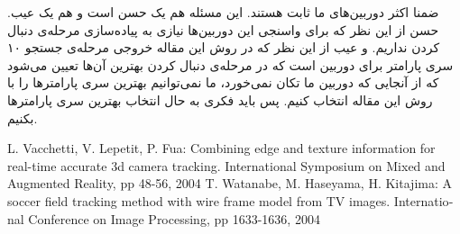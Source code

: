 \documentclass{report}
\renewcommand{\baselinestretch}{1.8}
\begin{document}
ضمنا اکثر دوربین‌های ما ثابت هستند. این مسئله هم یک حسن است و هم یک عیب. حسن از این نظر که برای واسنجی این دوربین‌ها نیازی به پیاده‌سازی مرحله‌ی دنبال کردن نداریم. و عیب از این نظر که در روش این مقاله خروجی مرحله‌ی جستجو ۱۰ سری پارامتر برای دوربین است که در مرحله‌ی دنبال کردن بهترین آن‌ها تعیین می‌شود که از آنجایی که دوربین ما تکان نمی‌خورد، ما نمی‌توانیم بهترین سری پارامترها را با روش این مقاله انتخاب کنیم. پس باید فکری به حال انتخاب بهترین سری پارامترها بکنیم.

\renewcommand{\baselinestretch}{1}
\renewcommand*{\refname}{\section{منابع}}
\begin{thebibliography}{9}
\begin{latin}
L. Vacchetti, V. Lepetit, P. Fua: Combining edge and texture information for real-time accurate 3d camera tracking. International Symposium on Mixed and Augmented Reality, pp 48-56, 2004
T. Watanabe, M. Haseyama, H. Kitajima: A soccer field tracking method with wire frame model from TV images. International Conference on Image Processing, pp 1633-1636, 2004

\end{latin}
\end{thebibliography}
\end{document}
